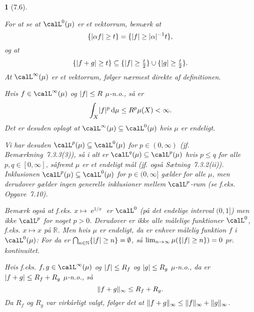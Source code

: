 \documentclass[a4paper, 11pt, article, danish, oneside]{memoir}
\newcommand{\naturals}{\mathbb{N}}
\newcommand{\reals}{\mathbb{R}}
\newcommand{\blank}{\mathrel{\;\cdot\;}}
\newcommand{\blankifempty}[1]{\ifstrempty{#1}{\blank}{#1}}
\DeclarePairedDelimiter{\auxdelimlvert}{\lvert}{\rvert}
\DeclarePairedDelimiter{\auxdelimlVert}{\lVert}{\rVert}
\newcommand{\abs}[2][]{\auxdelimlvert[#1]{\blankifempty{#2}}}
\newcommand{\norm}[1]{\auxdelimlVert{\blankifempty{#1}}}
\newcommand{\dif}{\mathop{}\!\mathrm{d}}
\newcommand*\union\cup
\DeclareMathOperator*{\smallbigcap}{\textstyle\bigcap}
\DeclareMathOperator*{\bigintersect}{\mathchoice
    {\smallbigcap}%
    {\bigcap}%
    {\bigcap}%
    {\bigcap}%
}
\DeclareMathOperator{\e}{\mathrm{e}}
\newcommand\inv{^{-1}}
\newcommand{\pencilsymbol}{\raisebox{-2pt}{\normalfont\PencilLeft}}
\theoremstyle{changedotcustomnumber}
\theoremstyle{changedotbreakcustomnumber}
\newtheorem{opgavebreak}{\pencilsymbol}
\begin{document}
\begin{opgavebreak}[7.6]
\begin{solutionsec}
    \item For at se at $\calL^0(\mu)$ er et vektorrum, bemærk at
    \begin{equation*}
        \{ \abs{\alpha f} \geq t \}
            = \{ \abs{f} \geq \abs{\alpha}\inv t \}, 
    \end{equation*}
    og at
    \begin{equation*}
        \{ \abs{f + g} \geq t \}
            \subseteq \{ \abs{f} \geq \tfrac{t}{2} \} \union \{ \abs{g} \geq \tfrac{t}{2} \}.
    \end{equation*}
    At $\calL^\infty(\mu)$ er et vektorrum, følger nærmest direkte af definitionen.

    \item Hvis $f \in \calL^\infty(\mu)$ og $\abs{f} \leq R$ $\mu$-n.o., så er
    \begin{equation*}
        \int_X \abs{f}^p \dif\mu
            \leq R^p \mu(X)
            < \infty.
    \end{equation*}
    Det er desuden oplagt at $\calL^\infty(\mu) \subseteq \calL^0(\mu)$ hvis $\mu$ er endeligt.
    
    Vi har desuden $\calL^p(\mu) \subseteq \calL^0(\mu)$ for $p \in (0,\infty)$ (jf. Bemærkning~7.3.3(3)), så i alt er $\calL^q(\mu) \subseteq \calL^p(\mu)$ hvis $p \leq q$ for alle $p,q \in [0,\infty]$, såfremt $\mu$ er et endeligt mål (jf. også Sætning~7.3.2(ii)). Inklusionen $\calL^p(\mu) \subseteq \calL^0(\mu)$ for $p \in (0,\infty]$ gælder for alle $\mu$, men derudover gælder ingen generelle inklusioner mellem $\calL^p$-rum (se f.eks. Opgave~7.10).
    
    Bemærk også at f.eks. $x \mapsto \e^{1/x}$ er $\calL^0$ (på det \emph{endelige} interval $(0,1]$) men ikke $\calL^p$ for noget $p > 0$. Derudover er ikke alle målelige funktioner $\calL^0$, f.eks. $x \mapsto x$ på $\reals$. Men hvis $\mu$ er endeligt, da er enhver målelig funktion $f$ i $\calL^0(\mu)$: For da er $\bigintersect_{n \in \naturals} \{\abs{f} \geq n\} = \emptyset$, så $\lim_{n \to \infty} \mu(\{\abs{f} \geq n\}) = 0$ pr. kontinuitet.
    
    \item Hvis f.eks. $f,g \in \calL^\infty(\mu)$ og $\abs{f} \leq R_f$ og $\abs{g} \leq R_g$ $\mu$-n.o., da er $\abs{f+g} \leq R_f + R_g$ $\mu$-n.o., så
    \begin{equation*}
        \norm{f + g}_\infty
            \leq R_f + R_g.
    \end{equation*}
    Da $R_f$ og $R_g$ var virkårligt valgt, følger det at $\norm{f+g}_\infty \leq \norm{f}_\infty + \norm{g}_\infty$.
\end{solutionsec}
\end{opgavebreak}
\end{document}
